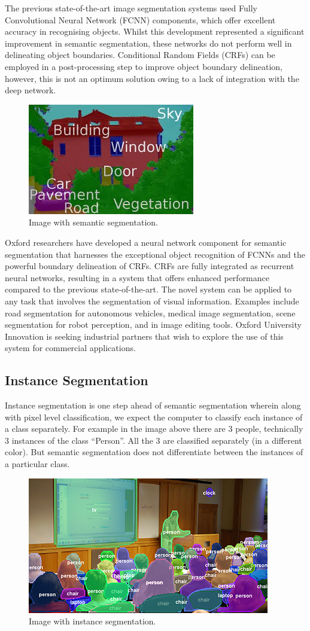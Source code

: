 The previous state-of-the-art image segmentation systems used Fully Convolutional Neural Network (FCNN) components, which offer excellent accuracy in recognising objects. Whilst this development represented a significant improvement in semantic segmentation, these networks do not perform well in delineating object boundaries. Conditional Random Fields (CRFs) can be employed in a post-processing step to improve object boundary delineation, however, this is not an optimum solution owing to a lack of integration with the deep network.
\begin{figure}[H]
	\centering
	\includegraphics[width=0.5\linewidth]{images/semantic.jpg}
	\caption{Image with semantic segmentation.}
\end{figure}
Oxford researchers have developed a neural network component for semantic segmentation that harnesses the exceptional object recognition of FCNNs and the powerful boundary delineation of CRFs. CRFs are fully integrated as recurrent neural networks, resulting in a system that offers enhanced performance compared to the previous state-of-the-art. The novel system can be applied to any task that involves the segmentation of visual information. Examples include road segmentation for autonomous vehicles, medical image segmentation, scene segmentation for robot perception, and in image editing tools. Oxford University Innovation is seeking industrial partners that wish to explore the use of this system for commercial applications.
\subsection{Instance Segmentation}\label{s:patt-insta}
Instance segmentation is one step ahead of semantic segmentation wherein along with pixel level classification, we expect the computer to classify each instance of a class separately. For example in the image above there are 3 people, technically 3 instances of the class “Person”. All the 3 are classified separately (in a different color). But semantic segmentation does not differentiate between the instances of a particular class.
\begin{figure}[H]
	\centering
	\includegraphics[width=0.5\linewidth]{images/instance.png}
	\caption{Image with instance segmentation.}
\end{figure}



